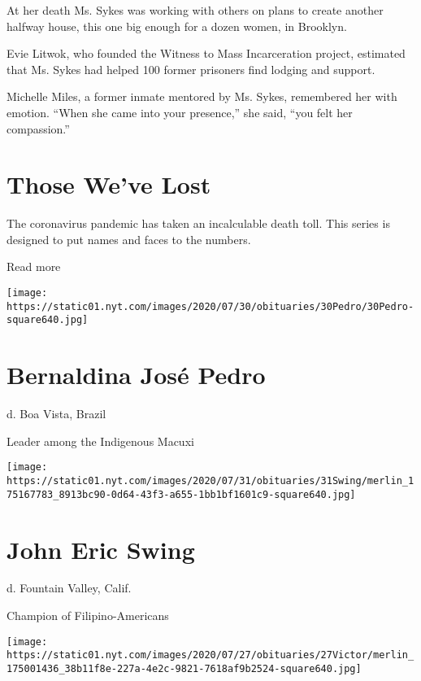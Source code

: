 At her death Ms. Sykes was working with others on plans to create
another halfway house, this one big enough for a dozen women, in
Brooklyn.

Evie Litwok, who founded the Witness to Mass Incarceration project,
estimated that Ms. Sykes had helped 100 former prisoners find lodging
and support.

Michelle Miles, a former inmate mentored by Ms. Sykes, remembered her
with emotion. ``When she came into your presence,'' she said, ``you felt
her compassion.''

\href{https://www.nytimes.com/interactive/2020/obituaries/people-died-coronavirus-obituaries.html?action=click\&pgtype=Article\&state=default\&region=BELOW_MAIN_CONTENT\&context=covid_obits_promo}{}

\hypertarget{those-weve-lost}{%
\section{Those We've Lost}\label{those-weve-lost}}

The coronavirus pandemic has taken an incalculable death toll. This
series is designed to put names and faces to the numbers.

Read more

\texttt{[image: https://static01.nyt.com/images/2020/07/30/obituaries/30Pedro/30Pedro-square640.jpg]}

\hypertarget{bernaldina-josuxe9-pedro}{%
\section{Bernaldina José Pedro}\label{bernaldina-josuxe9-pedro}}

d. Boa Vista, Brazil

Leader among the Indigenous Macuxi

\texttt{[image: https://static01.nyt.com/images/2020/07/31/obituaries/31Swing/merlin\_175167783\_8913bc90-0d64-43f3-a655-1bb1bf1601c9-square640.jpg]}

\hypertarget{john-eric-swing}{%
\section{John Eric Swing}\label{john-eric-swing}}

d. Fountain Valley, Calif.

Champion of Filipino-Americans

\texttt{[image: https://static01.nyt.com/images/2020/07/27/obituaries/27Victor/merlin\_175001436\_38b11f8e-227a-4e2c-9821-7618af9b2524-square640.jpg]}

